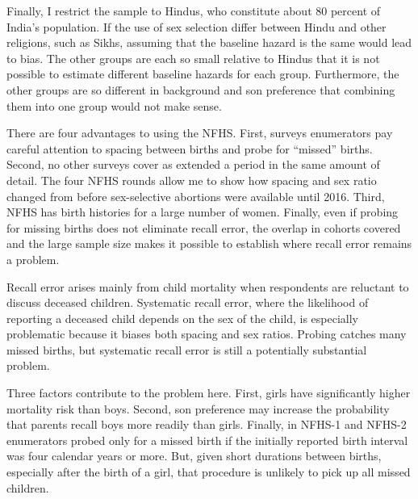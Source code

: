 \documentclass[12pt,letterpaper]{article}
\begin{document}
Finally, I restrict the sample to Hindus,
who constitute about 80 percent of India's population.
If the use of sex selection differ between Hindu and other religions, such 
as Sikhs, assuming that the baseline hazard is the same would lead to bias.
The other groups are each so small relative to Hindus that it is not
possible to estimate different baseline hazards for each group.
Furthermore, the other groups are so different in background and son 
preference that combining them into one group would not make sense.

There are four advantages to using the NFHS.
First, surveys enumerators pay careful attention to spacing between births and
probe for ``missed'' births.
Second, no other surveys cover as extended a period in the same amount of detail.
The four NFHS rounds allow me to show how spacing and 
sex ratio changed from before sex-selective abortions were available until 2016.
Third, NFHS has birth histories for a large number of women.
Finally, even if probing for missing births does not eliminate recall error,   
the overlap in cohorts covered and the large sample size makes it possible 
to establish where recall error remains a problem.

Recall error arises mainly from child mortality when respondents are 
reluctant to discuss deceased children.
Systematic recall error, where the likelihood of reporting a deceased 
child depends on the sex of the child, is especially problematic because 
it biases both spacing and sex ratios.
Probing catches many missed births, but systematic recall error is 
still a potentially substantial problem.

Three factors contribute to the problem here.
First, girls have significantly higher mortality risk than boys.
Second, son preference may increase the probability that parents recall boys 
more readily than girls.
Finally, in NFHS-1 and NFHS-2 enumerators probed only for a missed birth if the
initially reported birth interval was four calendar years or more.
But, given short durations between births, especially after the birth of a girl,
that procedure is unlikely to pick up all missed children.
\end{document}
